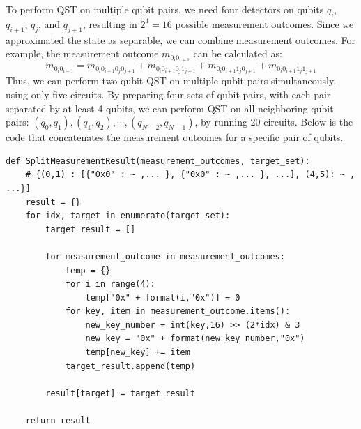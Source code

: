 \documentclass[a4paper, 11pt]{article}
\begin{document}
To perform QST on multiple qubit pairs, we need four detectors on qubits $q_i$, $q_{i+1}$, $q_j$, and $q_{j+1}$, resulting in $2^4 = 16$ possible measurement outcomes. 
Since we approximated the state as separable, we can combine measurement outcomes. For example, the measurement outcome $m_{0_i 0_{i+1}}$ can be calculated as:
\begin{equation}
  m_{0_i 0_{i+1} } =  m_{0_i 0_{i+1} 0_{j} 0_{j+1} } +  m_{0_i 0_{i+1} 0_{j} 1_{j+1}} +  m_{0_i 0_{i+1} 1_{j} 0_{j+1}} +  m_{0_i 0_{i+1} 1_{j} 1_{j+1} }
\end{equation}
Thus, we can perform two-qubit QST on multiple qubit pairs simultaneously, using only five circuits. 
By preparing four sets of qubit pairs, with each pair separated by at least 4 qubits, we can perform QST on all neighboring qubit pairs: ${(q_0, q_1), (q_1, q_2), \cdots, (q_{N-2}, q_{N-1})}$, by running 20 circuits.
Below is the code that concatenates the measurement outcomes for a specific pair of qubits.
\begin{verbatim}
def SplitMeasurementResult(measurement_outcomes, target_set):
    # {(0,1) : [{"0x0" : ~ ,... }, {"0x0" : ~ ,... }, ...], (4,5): ~ , ...}]
    result = {} 
    for idx, target in enumerate(target_set):
        target_result = []
        
        for measurement_outcome in measurement_outcomes:
            temp = {}
            for i in range(4):
                temp["0x" + format(i,"0x")] = 0
            for key, item in measurement_outcome.items():
                new_key_number = int(key,16) >> (2*idx) & 3
                new_key = "0x" + format(new_key_number,"0x")
                temp[new_key] += item
            target_result.append(temp)
        
        result[target] = target_result
    
    return result
\end{verbatim}
\end{document}
